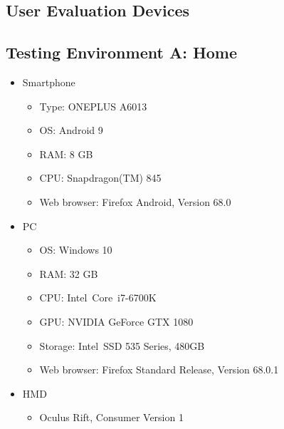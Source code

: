 
\begin{appendices}
  \chapter{User Evaluation Devices}\label{chapter:append-user-eval-devices}
  \section{Testing Environment A: Home}
  \begin{itemize}
    \item Smartphone
    \begin{itemize}
      \item Type: ONEPLUS A6013
      \item \ac{OS}: Android 9
      \item RAM: 8 GB
      \item CPU: Snapdragon(TM) 845 %
      \item Web browser: Firefox Android, Version 68.0
    \end{itemize}
    \item \ac{PC}
    \begin{itemize}
      \item \ac{OS}: Windows 10
      \item RAM: 32 GB
      \item CPU: Intel\textregistered\ Core\texttrademark\ i7-6700K %
      \item GPU: NVIDIA GeForce GTX 1080
      \item Storage: Intel\textregistered\ SSD 535 Series, 480GB
      \item Web browser: Firefox Standard Release, Version 68.0.1
    \end{itemize}
    \item \ac{HMD}
    \begin{itemize}
      \item Oculus Rift, Consumer Version 1
    \end{itemize}
  \end{itemize}

  \filbreak{}

\end{appendices}
